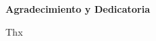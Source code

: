 \begin{center}
	{\large \bfseries  Agradecimiento y Dedicatoria}
\end{center}
\vspace{0.5cm}

Thx
\newline

